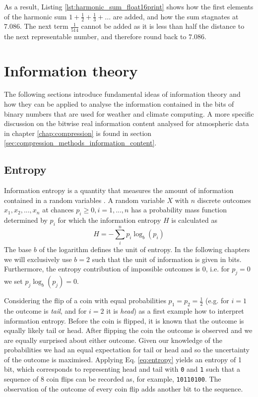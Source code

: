 As a result, Listing \ref{lst:harmonic_sum_float16print} shows how the first elements of the harmonic sum $1 + \tfrac{1}{2} + \tfrac{1}{3} + ...$ are added,
and how the sum stagnates at $7.086$. The next term $\tfrac{1}{514}$ cannot be added as it is less than half the distance to the next representable number,
and therefore round back to $7.086$.

\section{Information theory}
\label{sec:information}

The following sections introduce fundamental ideas of information theory and how they can be applied to analyse the information contained in the bits
of binary numbers that are used for weather and climate computing. A more specific discussion on the bitwise real information content analysed for
atmospheric data in chapter \ref{chap:compression} is found in section \ref{sec:compression_methods_information_content}.

\subsection{Entropy}
\label{sec:entropy}

Information entropy is a quantity that measures the amount of information contained in a random variables \citep{Shannon1948,MacKay2003}.
A random variable $X$ with $n$ discrete outcomes $x_1,x_2,...,x_n$ at chances $p_i \geq 0, i = 1,...,n$ has a probability mass function
determined by $p_i$ for which the information entropy $H$ is calculated as
\begin{equation}
	H = - \sum_i^n p_i \log_b(p_i)
	\label{eq:entropy}
\end{equation}
The base $b$ of the logarithm defines the unit of entropy. In the following chapters we will exclusively use $b=2$ such that the unit of information
is given in bits. Furthermore, the entropy contribution of impossible outcomes is $0$, i.e. for $p_j = 0$ we set $p_j \log_b(p_j) = 0$. 

Considering the flip of a coin with equal probabilities $p_1=p_2=\tfrac{1}{2}$ (e.g. for $i=1$ the outcome is \emph{tail}, and for $i=2$ it is \emph{head})
as a first example how to interpret information entropy. Before the coin is flipped, it is known that the outcome is equally likely tail or head. After flipping the
coin the outcome is observed and we are equally surprised about either outcome. Given our knowledge of the probabilities we had an equal expectation
for tail or head and so the uncertainty of the outcome is maximised. Applying Eq. \ref{eq:entropy} yields an entropy of 1 bit, which corresponds to
representing head and tail with \texttt{0} and \texttt{1} such that a sequence of 8 coin flips can be recorded as, for example, \texttt{10110100}.
The observation of the outcome of every coin flip adds another bit to the sequence.

